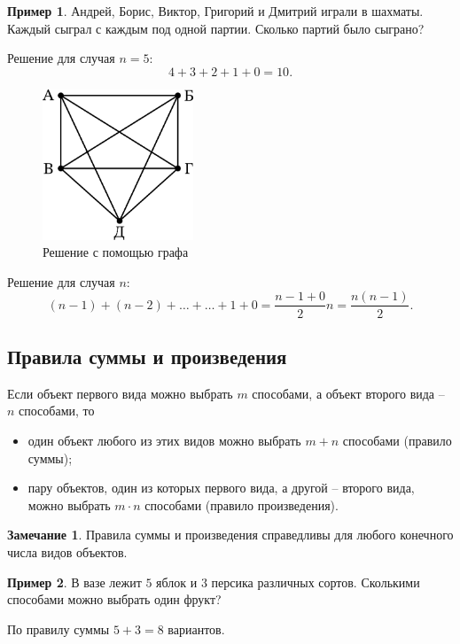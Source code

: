 \documentclass[a5paper, 11pt]{extarticle}
\theoremstyle{definition}
\newtheorem{example}{Пример}[subsection]
\theoremstyle{definition}
\theoremstyle{definition}
\newtheorem*{note*}{Замечание}
\numberwithin{figure}{section}
\numberwithin{table}{section}
\begin{document}
\begin{example}
    Андрей, Борис, Виктор, Григорий и Дмитрий играли в шахматы. Каждый сыграл с каждым под одной партии. Сколько партий было сыграно?

    Решение для случая \(n = 5\):
    \[
        4 + 3 + 2 + 1 + 0 = 10.
    \]

    \begin{figure}[H]
        \centering
        \includegraphics[width=0.4\textwidth]{images/graph-combinatorics.png}
        \caption{Решение с помощью графа}
    \end{figure}

    Решение для случая \(n\):
    \[
        (n - 1) + (n - 2) + \ldots + \ldots + 1 + 0 = \frac{n -1 + 0}{2} n = \frac{n(n - 1)}{2}.
    \]
\end{example}

\subsection{Правила суммы и произведения}

Если объект первого вида можно выбрать \(m\) способами, а объект второго вида -- \(n\) способами, то
\begin{itemize}
    \item один объект любого из этих видов можно выбрать \(m + n\) способами (правило суммы);
    \item пару объектов, один из которых первого вида, а другой -- второго вида, можно выбрать \(m \cdot n\) способами (правило произведения).
\end{itemize}

\begin{note*}
    Правила суммы и произведения справедливы для любого конечного числа видов объектов.
\end{note*}

\begin{example}
    В вазе лежит \(5\) яблок и \(3\) персика различных сортов. Сколькими способами можно выбрать один фрукт?

    По правилу суммы \(5 + 3 = 8\) вариантов.
\end{example}
\end{document}
